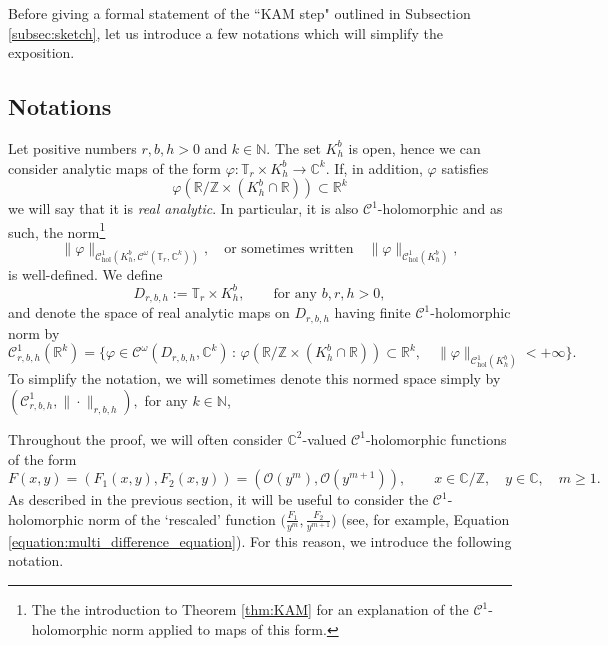 \documentclass[10pt]{article}
\newcommand{\Z}{\mathbb{Z}}
\newcommand{\N}{\mathbb{N}}
\newcommand{\R}{\mathbb{R}}
\newcommand{\C}{\mathbb{C}}
\newcommand{\T}{\mathbb{T}}
\newcommand{\ZZ}{\mathbb{Z}}
\newcommand{\RR}{\mathbb{R}}
\newcommand{\Domain}[3]{D_{#1, #2, #3}}
\begin{document}
Before giving a formal statement of the ``KAM step" outlined in Subsection \eqref{subsec:sketch}, let us introduce a few notations which will simplify the exposition.

\subsection{Notations}  


Let positive numbers $r,b,h>0$ and $k\in \N$. The set $K_h^b$ is open, hence we can consider analytic maps of the form $\varphi:\T_{r}\times K^{b}_{h}\to \C^k$. If, in addition, $\varphi$ satisfies
\begin{equation}
 \label{equation:real_analytic}
 \varphi(\R/\Z\times (K_h^b\cap\R))\subset\R^k
\end{equation}
we will say that it is \textit{real analytic}. In particular, it is also $\mathscr C^1$-holomorphic and as such, the norm\footnote{The the introduction to Theorem \ref{thm:KAM} for an explanation of the $\mathscr C^1$-holomorphic norm applied to maps of this form.}
\begin{equation}
\label{eq:norm_version_1}
\|\varphi\|_{\mathscr C_{\text{hol}}^1(K_h^b,\mathscr C^{\omega}(\T_r,\C^k))},
\quad\text{or sometimes written}\quad 
\|\varphi\|_{\mathscr C_{\text{hol}}^1(K_h^b)},
\end{equation}
is well-defined.
We define
\[ \Domain{r}{b}{h}:= \T_r \times K^b_h, \qquad \text{for any } b, r, h > 0,\]
and denote the space of real analytic maps on $\Domain{r}{b}{h}$ 
having finite $\mathscr C^1$-holomorphic norm by %
\[
\mathscr C^1_{r,b,h}(\RR^k) = \{ \varphi\in\mathscr C^{\omega}(\Domain{r}{b}{h},\C^k) \,:\, 
\varphi\left(\RR/\ZZ\times (K_h^b\cap\R)\right)\subset\R^k,\quad \|\varphi\|_{\mathscr C_{\text{hol}}^1(K_h^b)}<+\infty\}.
\]
To simplify the notation, we will sometimes denote this normed space simply by $(\mathscr C^1_{r,b,h}, \|\cdot\|_{r,b,h}),$ for any $k \in \N$,


Throughout the proof, we will often consider $\C^2$-valued $\mathscr{C}^1$-holomorphic functions of the form 
\begin{equation}
\label{eq:m_form}
F(x, y) = (F_1(x, y), F_2(x, y)) = (\mathcal{O}(y^m), \mathcal{O}(y^{m + 1})), \qquad x \in \C/\Z, \quad y \in \C, \quad m \geq 1.  %
\end{equation}
As described in the previous section, it will be useful to consider the $\mathscr C^1$-holomorphic norm of the `rescaled' function $\big(\tfrac{F_1}{y^m}, \tfrac{F_2}{y^{m + 1}} \big)$ (see, for example, Equation \eqref{equation:multi_difference_equation}). %
For this reason, we introduce the following notation.
\end{document}
